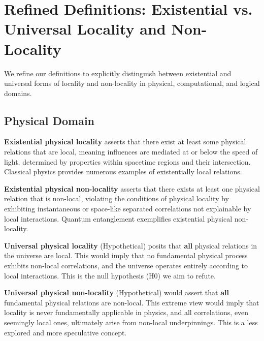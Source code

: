 	\section{Refined Definitions: Existential vs. Universal Locality and Non-Locality}
	
	We refine our definitions to explicitly distinguish between existential and universal forms of locality and non-locality in physical, computational, and logical domains.
	
	\subsection{Physical Domain}
	
	\begin{definition}
		\textbf{Existential physical locality} asserts that there exist at least some physical relations that are local, meaning influences are mediated at or below the speed of light, determined by properties within spacetime regions and their intersection.  Classical physics provides numerous examples of existentially local relations.
	\end{definition}
	
	\begin{definition}
		\textbf{Existential physical non-locality} asserts that there exists at least one physical relation that is non-local, violating the conditions of physical locality by exhibiting instantaneous or space-like separated correlations not explainable by local interactions. Quantum entanglement exemplifies existential physical non-locality.
	\end{definition}
	
	\begin{definition}
		\textbf{Universal physical locality} (Hypothetical) posits that \textbf{all} physical relations in the universe are local. This would imply that no fundamental physical process exhibits non-local correlations, and the universe operates entirely according to local interactions. This is the null hypothesis (H0) we aim to refute.
	\end{definition}
	
	\begin{definition}
		\textbf{Universal physical non-locality} (Hypothetical) would assert that \textbf{all} fundamental physical relations are non-local. This extreme view would imply that locality is never fundamentally applicable in physics, and all correlations, even seemingly local ones, ultimately arise from non-local underpinnings.  This is a less explored and more speculative concept.
	\end{definition}
	
